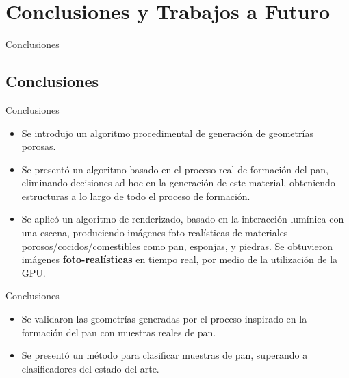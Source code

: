 \documentclass[spanish,unknownkeysallowed]{beamer}
\begin{document}
\section[Conclusiones]{Conclusiones y Trabajos a Futuro}


\begin{frame}
\begin{block}{}
\begin{center}
\vspace{1cm}
\huge{Conclusiones}
\vspace{1cm}
\end{center}
\end{block}
\end{frame}

\subsection{Conclusiones}
\begin{frame}{Conclusiones}
\begin{block}{}
\begin{itemize}
\item Se introdujo un algoritmo procedimental de generación de geometrías porosas.
\item Se presentó un algoritmo basado en el proceso real de formación del pan, eliminando decisiones ad-hoc en la generación de este material, obteniendo estructuras a lo largo de todo el proceso de formación.
\item Se aplicó un algoritmo de renderizado, basado en la interacción lumínica con una escena, produciendo imágenes foto-realísticas de materiales porosos/cocidos/comestibles como pan, esponjas, y piedras. Se obtuvieron imágenes \textbf{foto-realísticas} en tiempo real, por medio de la utilización de la GPU.
\end{itemize}
\end{block}
\end{frame}

\begin{frame}{Conclusiones}
\begin{block}{}
\begin{itemize}
\item Se validaron las geometrías generadas por el proceso inspirado en la formación del pan con muestras reales de pan.
\item Se presentó un método para clasificar muestras de pan, superando a clasificadores del estado del arte.
\end{itemize}
\end{block}
\end{frame}
\end{document}
